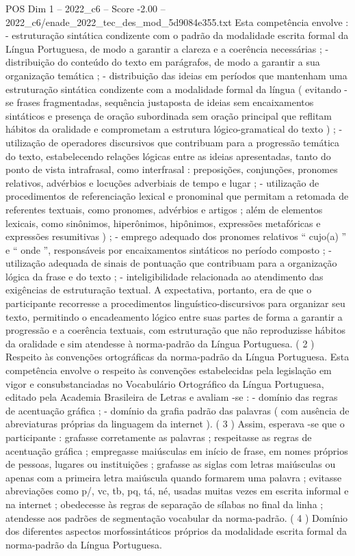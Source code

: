\begin{textsample}{POS Dim 1 – 2022\_c6 – Score -2.00 – 2022\_c6/enade\_2022\_tec\_des\_mod\_5d9084e355.txt}
Esta competência envolve : - estruturação sintática condizente com o padrão da modalidade escrita formal da Língua Portuguesa, de modo a garantir a clareza e a coerência necessárias ; - distribuição do conteúdo do texto em parágrafos, de modo a garantir a sua organização temática ; - distribuição das ideias em períodos que mantenham uma estruturação sintática condizente com a modalidade formal da língua ( evitando -se frases fragmentadas, sequência justaposta de ideias sem encaixamentos sintáticos e presença de oração subordinada sem oração principal que reflitam hábitos da oralidade e comprometam a estrutura lógico-gramatical do texto ) ; - utilização de operadores discursivos que contribuam para a progressão temática do texto, estabelecendo relações lógicas entre as ideias apresentadas, tanto do ponto de vista intrafrasal, como interfrasal : preposições, conjunções, pronomes relativos, advérbios e locuções adverbiais de tempo e lugar ; - utilização de procedimentos de referenciação lexical e pronominal que permitam a retomada de referentes textuais, como pronomes, advérbios e artigos ; além de elementos lexicais, como sinônimos, hiperônimos, hipônimos, expressões metafóricas e expressões resumitivas ) ; - emprego adequado dos pronomes relativos “ cujo(a) ” e “ onde ”, responsáveis por encaixamentos sintáticos no período composto ; - utilização adequada de sinais de pontuação que contribuam para a organização lógica da frase e do texto ; - inteligibilidade relacionada ao atendimento das exigências de estruturação textual.
A expectativa, portanto, era de que o participante recorresse a procedimentos linguístico-discursivos para organizar seu texto, permitindo o encadeamento lógico entre suas partes de forma a garantir a progressão e a coerência textuais, com estruturação que não reproduzisse hábitos da oralidade e sim atendesse à norma-padrão da Língua Portuguesa. ( 2 ) Respeito às convenções ortográficas da norma-padrão da Língua Portuguesa.
Esta competência envolve o respeito às convenções estabelecidas pela legislação em vigor e consubstanciadas no Vocabulário Ortográfico da Língua Portuguesa, editado pela Academia Brasileira de Letras e avaliam -se : - domínio das regras de acentuação gráfica ; - domínio da grafia padrão das palavras ( com ausência de abreviaturas próprias da linguagem da internet ). ( 3 ) Assim, esperava -se que o participante : grafasse corretamente as palavras ; respeitasse as regras de acentuação gráfica ; empregasse maiúsculas em início de frase, em nomes próprios de pessoas, lugares ou instituições ; grafasse as siglas com letras maiúsculas ou apenas com a primeira letra maiúscula quando formarem uma palavra ; evitasse abreviações como p/, vc, tb, pq, tá, né, usadas muitas vezes em escrita informal e na internet ; obedecesse às regras de separação de sílabas no final da linha ; atendesse aos padrões de segmentação vocabular da norma-padrão. ( 4 ) Domínio dos diferentes aspectos morfossintáticos próprios da modalidade escrita formal da norma-padrão da Língua Portuguesa.

\end{textsample}
